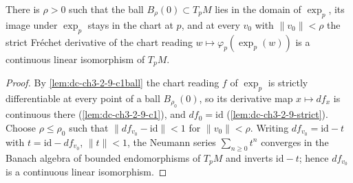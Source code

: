 \begin{lemma}
  \label{lem:dc-ch3-2-9-invertible}


  There is $\rho > 0$ such that the ball $B_\rho(0) \subset T_pM$ lies in the
  domain of $\exp_p$, its image under $\exp_p$ stays in the chart at $p$, and
  at every $v_0$ with $\|v_0\| < \rho$ the strict Fr\'echet derivative of the
  chart reading $w \mapsto \varphi_p(\exp_p(w))$ is a continuous linear
  isomorphism of $T_pM$.
\end{lemma}
\begin{proof}
  \sketch

  By \cref{lem:dc-ch3-2-9-c1ball} the chart reading $f$ of $\exp_p$ is strictly
  differentiable at every point of a ball $B_{\rho_0}(0)$, so its derivative
  map $x \mapsto df_x$ is continuous there (\cref{lem:dc-ch3-2-9-c1}), and
  $df_0 = \mathrm{id}$ (\cref{lem:dc-ch3-2-9-strict}). Choose
  $\rho \le \rho_0$ such that $\|df_{v_0} - \mathrm{id}\| < 1$ for
  $\|v_0\| < \rho$. Writing $df_{v_0} = \mathrm{id} - t$ with
  $t = \mathrm{id} - df_{v_0}$, $\|t\| < 1$, the Neumann series
  $\sum_{n \ge 0} t^n$ converges in the Banach algebra of bounded endomorphisms
  of $T_pM$ and inverts $\mathrm{id} - t$; hence $df_{v_0}$ is a continuous
  linear isomorphism.
\end{proof}

